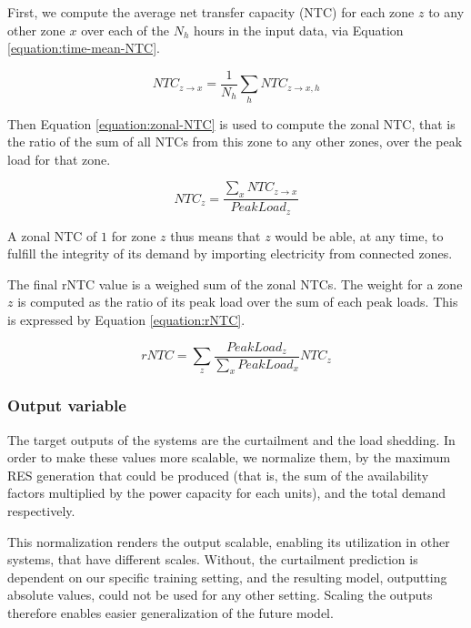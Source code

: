 \begin{enumerate}
    First, we compute the average net transfer capacity (NTC) for each zone $z$ to any other zone $x$ over each of the $N_h$ hours in the input data, via Equation \ref{equation:time-mean-NTC}.

    \begin{equation}
        NTC_{z\rightarrow x} = \frac{1}{N_h} \sum_h NTC_{z\rightarrow x,h}
        \label{equation:time-mean-NTC}
    \end{equation}

    Then Equation \ref{equation:zonal-NTC} is used to compute the zonal NTC, that is the ratio of the sum of all NTCs from this zone to any other zones, over the peak load for that zone.

    \begin{equation}
        NTC_z = \frac{\sum_x NTC_{z\rightarrow x}}{PeakLoad_z}
        \label{equation:zonal-NTC}
    \end{equation}

    A zonal NTC of $1$ for zone $z$ thus means that $z$ would be able, at any time, to fulfill the integrity of its demand by importing electricity from connected zones.

    The final rNTC value is a weighed sum of the zonal NTCs. The weight for a zone $z$ is computed as the ratio of its peak load over the sum of each peak loads. This is expressed by Equation \ref{equation:rNTC}.

    \begin{equation}
        rNTC = \sum_z \frac{PeakLoad_z}{\sum_x PeakLoad_x} NTC_z
        \label{equation:rNTC}
    \end{equation}
\end{enumerate}

\subsubsection{Output variable \label{ssec:output-variables}}

The target outputs of the systems are the curtailment and the load shedding. In order to make these values more scalable, we normalize them, by the maximum RES generation that could be produced (that is, the sum of the availability factors multiplied by the power capacity for each units), and the total demand respectively.

This normalization renders the output scalable, enabling its utilization in other systems, that have different scales. Without, the curtailment prediction is dependent on our specific training setting, and the resulting model, outputting absolute values, could not be used for any other setting. Scaling the outputs therefore enables easier generalization of the future model.

